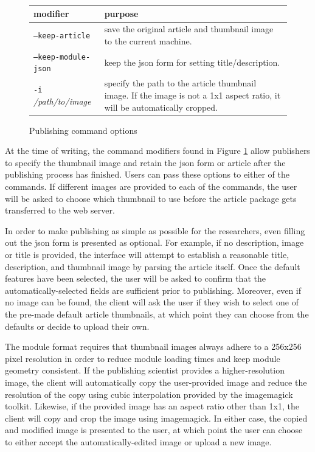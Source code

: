\documentclass[12pt]{article}
\begin{document}
\begin{figure}[h]
  \centering
  \begin{tabular}{l | p{8cm}}
  \textbf{modifier} & \textbf{purpose} \\\hline
  \texttt{--keep-article} & save the original article and thumbnail image to the current machine. \\\hline
  \texttt{--keep-module-json} & keep the json form for setting title/description. \\\hline
  \texttt{-i} \textit{/path/to/image} & specify the path to the article thumbnail image. If the image is not a 1x1 aspect ratio, it will be automatically cropped. \\
  \end{tabular}
  \caption{Publishing command options}
  \label{cli opt}
\end{figure}

At the time of writing, the command modifiers found in Figure \ref{cli opt} allow publishers to specify the thumbnail image and retain the json form or article after the publishing process has finished. Users can pass these options to either of the commands. If different images are provided to each of the commands, the user will be asked to choose which thumbnail to use before the article package gets transferred to the web server.

In order to make publishing as simple as possible for the researchers, even filling out the json form is presented as optional. For example, if no description, image or title is provided, the interface will attempt to establish a reasonable title, description, and thumbnail image by parsing the article itself. Once the default features have been selected, the user will be asked to confirm that the automatically-selected fields are sufficient prior to publishing. Moreover, even if no image can be found, the client will ask the user if they wish to select one of the pre-made default article thumbnails, at which point they can choose from the defaults or decide to upload their own.

The module format requires that thumbnail images always adhere to a 256x256 pixel resolution in order to reduce module loading times and keep module geometry consistent. If the publishing scientist provides a higher-resolution image, the client will automatically copy the user-provided image and reduce the resolution of the copy using cubic interpolation provided by the imagemagick toolkit. Likewise, if the provided image has an aspect ratio other than 1x1, the client will copy and crop the image using imagemagick. In either case, the copied and modified image is presented to the user, at which point the user can choose to either accept the automatically-edited image or upload a new image.
\end{document}
